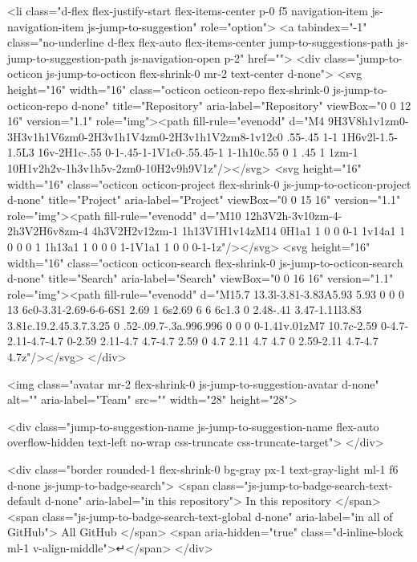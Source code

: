 <li class="d-flex flex-justify-start flex-items-center p-0 f5 navigation-item js-navigation-item js-jump-to-suggestion" role="option">
  <a tabindex="-1" class="no-underline d-flex flex-auto flex-items-center jump-to-suggestions-path js-jump-to-suggestion-path js-navigation-open p-2" href="">
    <div class="jump-to-octicon js-jump-to-octicon flex-shrink-0 mr-2 text-center d-none">
      <svg height="16" width="16" class="octicon octicon-repo flex-shrink-0 js-jump-to-octicon-repo d-none" title="Repository" aria-label="Repository" viewBox="0 0 12 16" version="1.1" role="img"><path fill-rule="evenodd" d="M4 9H3V8h1v1zm0-3H3v1h1V6zm0-2H3v1h1V4zm0-2H3v1h1V2zm8-1v12c0 .55-.45 1-1 1H6v2l-1.5-1.5L3 16v-2H1c-.55 0-1-.45-1-1V1c0-.55.45-1 1-1h10c.55 0 1 .45 1 1zm-1 10H1v2h2v-1h3v1h5v-2zm0-10H2v9h9V1z"/></svg>
      <svg height="16" width="16" class="octicon octicon-project flex-shrink-0 js-jump-to-octicon-project d-none" title="Project" aria-label="Project" viewBox="0 0 15 16" version="1.1" role="img"><path fill-rule="evenodd" d="M10 12h3V2h-3v10zm-4-2h3V2H6v8zm-4 4h3V2H2v12zm-1 1h13V1H1v14zM14 0H1a1 1 0 0 0-1 1v14a1 1 0 0 0 1 1h13a1 1 0 0 0 1-1V1a1 1 0 0 0-1-1z"/></svg>
      <svg height="16" width="16" class="octicon octicon-search flex-shrink-0 js-jump-to-octicon-search d-none" title="Search" aria-label="Search" viewBox="0 0 16 16" version="1.1" role="img"><path fill-rule="evenodd" d="M15.7 13.3l-3.81-3.83A5.93 5.93 0 0 0 13 6c0-3.31-2.69-6-6-6S1 2.69 1 6s2.69 6 6 6c1.3 0 2.48-.41 3.47-1.11l3.83 3.81c.19.2.45.3.7.3.25 0 .52-.09.7-.3a.996.996 0 0 0 0-1.41v.01zM7 10.7c-2.59 0-4.7-2.11-4.7-4.7 0-2.59 2.11-4.7 4.7-4.7 2.59 0 4.7 2.11 4.7 4.7 0 2.59-2.11 4.7-4.7 4.7z"/></svg>
    </div>

    <img class="avatar mr-2 flex-shrink-0 js-jump-to-suggestion-avatar d-none" alt="" aria-label="Team" src="" width="28" height="28">

    <div class="jump-to-suggestion-name js-jump-to-suggestion-name flex-auto overflow-hidden text-left no-wrap css-truncate css-truncate-target">
    </div>

    <div class="border rounded-1 flex-shrink-0 bg-gray px-1 text-gray-light ml-1 f6 d-none js-jump-to-badge-search">
      <span class="js-jump-to-badge-search-text-default d-none" aria-label="in this repository">
        In this repository
      </span>
      <span class="js-jump-to-badge-search-text-global d-none" aria-label="in all of GitHub">
        All GitHub
      </span>
      <span aria-hidden="true" class="d-inline-block ml-1 v-align-middle">↵</span>
    </div>

